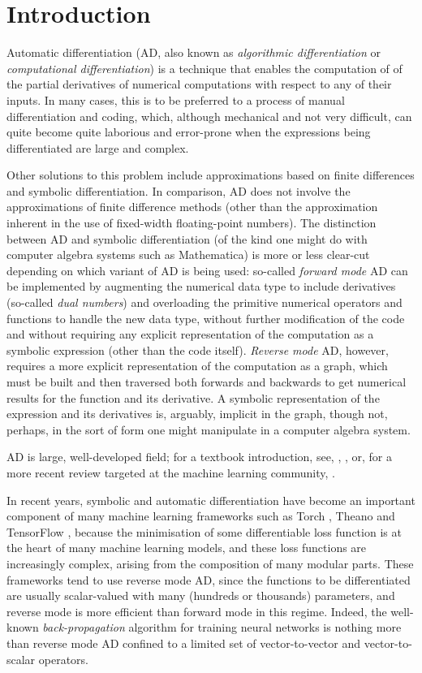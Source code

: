 \section{Introduction}
Automatic differentiation (AD, also known as \emph{algorithmic differentiation}
or \emph{computational differentiation}) is a technique that enables the computation of
of the partial derivatives of numerical computations with respect to
any of their inputs. In many cases, this is to be preferred to
a process of manual differentiation and coding, which, although mechanical
and not very difficult, can quite become quite laborious and error-prone 
when the expressions being differentiated are large and complex.

Other solutions to this problem include approximations based on finite
differences and symbolic differentiation. In comparison, AD
does not involve the approximations of finite difference methods (other
than the approximation inherent in the use of fixed-width floating-point numbers).
The distinction between AD and symbolic differentiation
(of the kind one might do with computer algebra systems such as Mathematica)
is more or less clear-cut depending on which variant of AD is being used: 
so-called \emph{forward mode} AD can be implemented by augmenting
the numerical data type to include derivatives (so-called \emph{dual numbers})
and overloading the primitive numerical operators and functions to handle the new 
data type, without further modification of the code and without requiring any explicit representation 
of the computation as a symbolic expression (other than the code itself).
\emph{Reverse mode} AD, however, requires a more
explicit representation of the computation as a graph, which must be built and
then traversed both forwards and backwards to get numerical results for the function
and its derivative. A symbolic representation of the expression and its derivatives 
is, arguably, implicit in the graph, though not, perhaps, in the sort of form  
one might manipulate in a computer algebra system. 

AD is large, well-developed field; for a textbook introduction, see, \eg,
\cite{GriewankWalther2008}, or, for a more recent review targeted at the
machine learning community, \cite{BaydinPearlmutterRadul2015}. 

In recent years, symbolic and automatic differentiation have become an important component
of many machine learning frameworks such as Torch \citep{CollobertKavukcuogluFarabet2011}, 
Theano \citep{2016arXiv160502688short} 
and TensorFlow \citep{MartinAbadiAshishAgarwalPaulBarham2015}, because the 
minimisation of some differentiable loss function is at the heart of many 
machine learning models, and these loss functions are increasingly complex,
arising from the composition of many modular parts. These frameworks tend to use
reverse mode AD, since the functions to be differentiated are usually scalar-valued 
with many (hundreds or thousands) parameters, and reverse mode is more efficient than
forward mode in this regime. Indeed, the well-known \emph{back-propagation} algorithm
for training neural networks \citep{RumelhartHintonMcClelland1986} is nothing more than
reverse mode AD confined to a limited set of vector-to-vector and vector-to-scalar operators.

